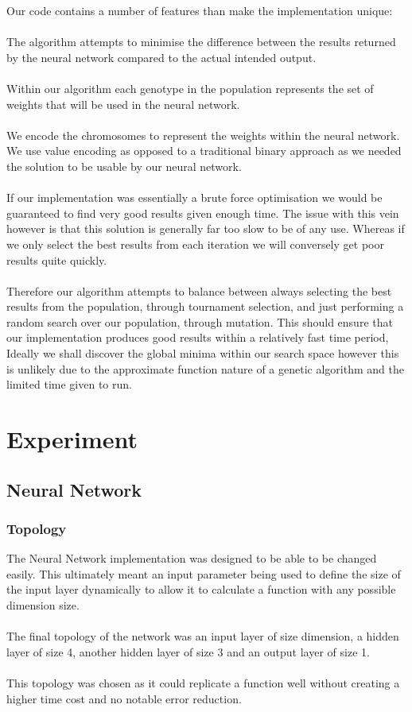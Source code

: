 \documentclass[12pt]{article}
\begin{document}
Our code contains a number of features than make the implementation unique: \\\\
The algorithm attempts to minimise the difference between the results returned by the neural network compared to the actual intended output.\\\\
Within our algorithm each genotype in the population represents the set of weights that will be used in the neural network.\\\\
We encode the chromosomes to represent the weights within the neural network. We use value encoding as opposed to a traditional binary approach as we needed the solution to be usable by our neural network. \\\\
If our implementation was essentially a brute force optimisation we would be guaranteed to find very good results given enough time. The issue with this vein however is that this solution is generally far too slow to be of any use. Whereas if we only select the best results from each iteration we will conversely get poor results quite quickly. \\\\
Therefore our algorithm attempts to balance between always selecting the best results from the population, through tournament selection, and just performing a random search over our population, through mutation. This should ensure that our implementation produces good results within a relatively fast time period, Ideally we shall discover the global minima within our search space  however this is unlikely due to the approximate function nature of a genetic algorithm and the limited time given to run.

\newpage
\section{Experiment}
\subsection{Neural Network}
\subsubsection{Topology}
The Neural Network implementation was designed to be able to be changed easily. This ultimately meant an input parameter being used to define the size of the input layer dynamically to allow it to calculate a function with any possible dimension size.\\\\
The final topology of the network was an input layer of size dimension, a hidden layer of size 4, another hidden layer of size 3 and an output layer of size 1.\\\\
This topology was chosen as it could replicate a function well without creating a higher time cost and no notable error reduction.
\end{document}
